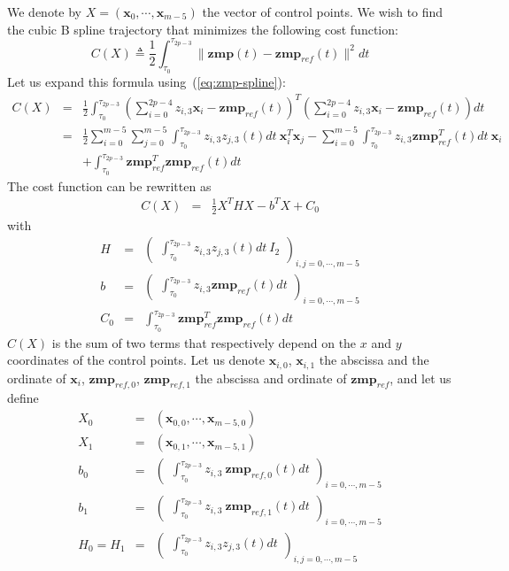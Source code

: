 \documentclass {article}
\newcommand\x{\mathbf{x}}
\newcommand\z{z}
\newcommand\zmp{\mathbf{zmp}}
\newcommand\zmpref{\mathbf{zmp}_{ref}}
\newcommand\zmprefx{\mathbf{zmp}_{ref, 0}}
\newcommand\zmprefy{\mathbf{zmp}_{ref, 1}}
\begin{document}
We denote by $X=(\x_0, \cdots, \x_{m-5})$ the vector of control points.
We wish to find the cubic B spline trajectory that minimizes the
following cost function:
\begin{equation}\label{eq:qudratic-cost}
C(X) \triangleq \frac{1}{2}\int_{\tau_0}^{\tau_{2p-3}} \|\zmp (t) - \zmpref (t)\|^2 dt
\end{equation}
Let us expand this formula using~(\ref{eq:zmp-spline}):
\begin{eqnarray*}
C(X) &=& \frac{1}{2}\int_{\tau_0}^{\tau_{2p-3}} (\sum_{i=0}^{2p-4} \z_{i,3} \x_{i} - \zmpref (t))^T(\sum_{i=0}^{2p-4} \z_{i,3} \x_{i} - \zmpref (t)) dt\\
&=& \frac{1}{2}\sum_{i=0}^{m-5}\sum_{j=0}^{m-5}\int_{\tau_0}^{\tau_{2p-3}} \z_{i,3} \z_{j,3} (t) dt\  \x_i^T\x_j - \sum_{i=0}^{m-5}\int_{\tau_0}^{\tau_{2p-3}}\z_{i,3}\zmpref^T(t)dt\ \x_i\\
&&+ \int_{\tau_0}^{\tau_{2p-3}} \zmpref^T\zmpref (t)dt
\end{eqnarray*}
The cost function can be rewritten as
\begin{eqnarray*}
C(X) &=& \frac{1}{2}X^THX - b^T X + C_0
\end{eqnarray*}
with
\begin{eqnarray*}
H &=& \left(\begin{array}{c}
\int_{\tau_0}^{\tau_{2p-3}} \z_{i,3} \z_{j,3}(t)dt\ I_2 \end{array}\right)_{i,j=0,\cdots,m-5} \\
b &=& \left(\begin{array}{c}\int_{\tau_0}^{\tau_{2p-3}}\z_{i,3}\zmpref(t)dt\end{array}\right)_{i=0,\cdots,m-5}\\
C_0 &=&\int_{\tau_0}^{\tau_{2p-3}} \zmpref^T\zmpref (t)dt
\end{eqnarray*}
$C(X)$ is the sum of two terms that respectively depend on the $x$ and $y$
coordinates of the control points. Let us denote $\x_{i,0}$, $\x_{i,1}$ the abscissa and the ordinate of $\x_i$, $\zmprefx$, $\zmprefy$ the abscissa and ordinate of $\zmpref$, and let us define
\begin{eqnarray*}
  X_0 &=& (\x_{0,0},\cdots,\x_{m-5,0}) \\
  X_1 &=& (\x_{0,1},\cdots,\x_{m-5,1}) \\
  b_0 &=& \left(\begin{array}{c}\int_{\tau_0}^{\tau_{2p-3}}\z_{i,3}\ \zmprefx(t)dt\end{array}\right)_{i=0,\cdots,m-5}\\
  b_1 &=& \left(\begin{array}{c}\int_{\tau_0}^{\tau_{2p-3}}\z_{i,3}\ \zmprefy(t)dt\end{array}\right)_{i=0,\cdots,m-5}\\
  H_0 = H_1 &=& \left(\begin{array}{c}
    \int_{\tau_0}^{\tau_{2p-3}} \z_{i,3} \z_{j,3}(t)dt \end{array}\right)_{i,j=0,\cdots,m-5} \\
\end{eqnarray*}
\end{document}
